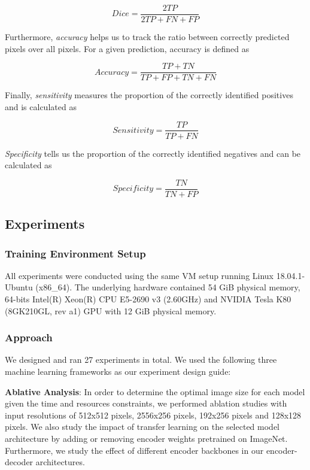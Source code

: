 \begin{equation}
  Dice = \frac{2TP}{2TP + FN + FP}
\end{equation}

Furthermore, \emph{accuracy} helps us to track the ratio between correctly predicted pixels over all pixels. For a given prediction, accuracy is defined as

\begin{equation}
  Accuracy = \frac{TP + TN}{TP + FP + TN + FN}
\end{equation}

Finally, \emph{sensitivity} measures the proportion of the correctly identified positives and is   calculated as

\begin{equation}
  Sensitivity = \frac{TP}{TP + FN}
\end{equation}

\emph{Specificity} tells us the proportion of the correctly identified negatives  and can be calculated as

\begin{equation}
  Specificity = \frac{TN}{TN + FP}
\end{equation}


\subsection{Experiments}

\subsubsection{Training Environment Setup}

All experiments were conducted using the same VM setup running Linux 18.04.1-Ubuntu (x86\_64). The underlying hardware contained 54 GiB physical memory, 64-bits Intel(R) Xeon(R) CPU E5-2690 v3 (2.60GHz) and NVIDIA Tesla K80 (8GK210GL, rev a1) GPU with 12 GiB physical memory.

\subsubsection{Approach}

We designed and ran 27 experiments in total. We used the following three machine learning frameworks as our experiment design guide:

\textbf{Ablative Analysis}: In order to determine the optimal image size for each model given the time and resources constraints, we performed ablation studies with input resolutions of 512x512 pixels, 2556x256 pixels, 192x256 pixels and 128x128 pixels. We also study the impact of transfer learning on the selected model architecture by adding or removing encoder weights pretrained on ImageNet. Furthermore, we study the effect of different encoder backbones in our encoder-decoder architectures.

